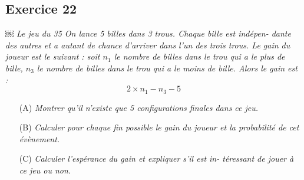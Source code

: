 \subsection*{Exercice 22}
\textit{￼ Le jeu du 35
On lance 5 billes dans 3 trous. Chaque bille est indépen- dante des autres et a autant de chance d’arriver dans l’un des trois trous. Le gain du joueur est le suivant : soit $n_1$ le nombre de billes dans le trou qui a le plus de bille, $n_3$ le nombre de billes dans le trou qui a le moins de bille. Alors le gain est :}
\begin{equation*}
   2 \times n_1 - n_3 - 5
\end{equation*}

\begin{itemize}
    \item[(A)]  \textit{Montrer qu’il n’existe que 5 configurations finales dans ce jeu.}
    \item[(B)]  \textit{Calculer pour chaque fin possible le gain du joueur et la probabilité de cet évènement.}
    \item[(C)]  \textit{Calculer l’espérance du gain et expliquer s’il est in- téressant de jouer à ce jeu ou non.}
\end{itemize}